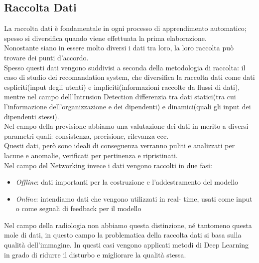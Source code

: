 \documentclass[../tesi.tex]{subfiles}
\begin{document}
\subsection{Raccolta Dati}
La raccolta dati è fondamentale in ogni processo di apprendimento automatico; spesso si diversifica quando viene effettuata la prima elaborazione.\\
Nonostante siano in essere molto diversi i dati tra loro, la loro raccolta può trovare dei punti d’accordo.\\
Spesso questi dati vengono suddivisi a seconda della metodologia di raccolta: il caso di studio dei recomandation system, che diversifica la raccolta dati come dati espliciti(input degli utenti) e impliciti(informazioni raccolte da flussi di dati), mentre nel campo dell’Intrusion Detection differenzia tra dati statici(tra cui l’informazione dell’organizzazione e dei dipendenti) e dinamici(quali gli input dei dipendenti stessi).\\
Nel campo della previsione abbiamo una valutazione dei dati in merito a diversi parametri quali: consistenza, precisione, rilevanza ecc. \\
Questi dati, però sono ideali di conseguenza verranno puliti e analizzati per lacune e anomalie, verificati per pertinenza e ripristinati.\\
Nel campo del Networking invece i dati vengono raccolti in due fasi:
\begin{itemize}
  \item \textit{Offline}: dati importanti per la costruzione e l’addestramento del modello 
  \item \textit{Online}: intendiamo dati che vengono utilizzati in real- time, usati come input o come segnali di feedback per il modello
\end{itemize}
Nel campo della radiologia non abbiamo questa distinzione, né tantomeno questa mole di dati, in questo campo la problematica della raccolta dati si basa sulla qualità dell’immagine. In questi casi vengono applicati metodi di \Gls{Deep Learning} in grado di ridurre il disturbo e migliorare la qualità stessa.
\end{document}
